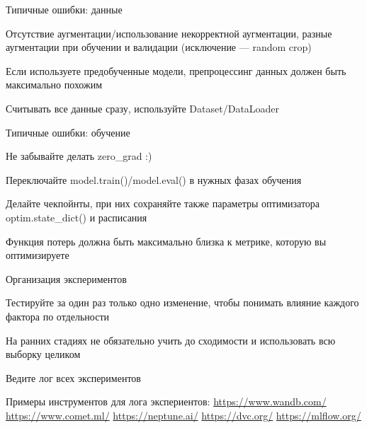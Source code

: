 \documentclass[notes,12pt, aspectratio=169]{beamer}
\newenvironment{wideitemize}{\itemize\addtolength{\itemsep}{10pt}}{\enditemize}
\begin{document}
\begin{frame}{Типичные ошибки: данные}
	\begin{wideitemize}
		\item Отсутствие аугментации/использование некорректной аугментации, разные аугментации при обучении и валидации  (исключение — random crop)
		\item Если используете предобученные модели, препроцессинг данных должен быть максимально похожим 
		\item Считывать все данные сразу, используйте Dataset/DataLoader
	\end{wideitemize}
\end{frame}


\begin{frame}{Типичные ошибки: обучение}
	\begin{wideitemize}
		\item Не забывайте делать zero\_grad :)
		\item Переключайте model.train()/model.eval() в нужных фазах обучения  
		\item Делайте чекпойнты, при них сохраняйте также параметры оптимизатора optim.state\_dict() и расписания
		\item Функция потерь должна быть максимально близка к метрике, которую вы оптимизируете 
	\end{wideitemize}
\end{frame}


\begin{frame}{Организация экспериментов}
	\begin{wideitemize}
		\item \alert{Тестируйте за один раз только одно изменение,} чтобы понимать влияние каждого фактора по отдельности 
		\item На ранних стадиях не обязательно учить до сходимости и использовать всю выборку целиком
		\item  Ведите лог всех экспериментов
		\item Примеры инструментов для лога экспериентов:  \newline 
		{\color{blue} 
		\url{https://www.wandb.com/}  \newline 
		\url{https://www.comet.ml/}  \newline 
		\url{https://neptune.ai/}  \newline 
		\url{https://dvc.org/}  \newline 
		\url{https://mlflow.org/}  \newline }
	\end{wideitemize}	
\end{frame}
\end{document}
